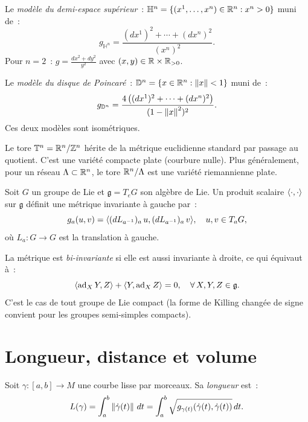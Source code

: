 \begin{exemple}
\label{ex:hyperbolique}
Le \emph{mod\`ele du demi-espace sup\'erieur}~: $\mathbb{H}^n = \{(x^1, \ldots, x^n)
\in \mathbb{R}^n : x^n > 0\}$ muni de~:
\[
    g_{\mathbb{H}^n} = \frac{(dx^1)^2 + \cdots + (dx^n)^2}{(x^n)^2}.
\]
Pour $n = 2$~: $g = \frac{dx^2 + dy^2}{y^2}$ avec $(x, y) \in \mathbb{R} \times \mathbb{R}_{>0}$.

Le \emph{mod\`ele du disque de Poincar\'e}~: $\mathbb{D}^n = \{x \in \mathbb{R}^n : \left\| x \right\| < 1\}$
muni de~:
\[
    g_{\mathbb{D}^n} = \frac{4\left((dx^1)^2 + \cdots + (dx^n)^2\right)}{(1 - \left\| x \right\|^2)^2}.
\]
Ces deux mod\`eles sont isom\'etriques.
\end{exemple}

\begin{exemple}
\label{ex:tore}
Le tore $\mathbb{T}^n = \mathbb{R}^n / \mathbb{Z}^n$ h\'erite de la m\'etrique euclidienne standard
par passage au quotient. C'est une vari\'et\'e compacte plate (courbure nulle).
Plus g\'en\'eralement, pour un r\'eseau $\Lambda \subset \mathbb{R}^n$, le tore $\mathbb{R}^n/\Lambda$
est une vari\'et\'e riemannienne plate.
\end{exemple}

\begin{exemple}
\label{ex:lie}
Soit $G$ un groupe de Lie et $\mathfrak{g} = T_eG$ son alg\`ebre de Lie. Un
produit scalaire $\langle \cdot, \cdot \rangle$ sur $\mathfrak{g}$ d\'efinit une m\'etrique
invariante \`a gauche par~:
\[
    g_a(u, v) = \langle (dL_{a^{-1}})_a\, u, (dL_{a^{-1}})_a\, v \rangle,
    \quad u, v \in T_aG,
\]
o\`u $L_a : G \to G$ est la translation \`a gauche.

La m\'etrique est \emph{bi-invariante} si elle est aussi invariante \`a droite, ce
qui \'equivaut \`a~:
\[
    \langle \operatorname{ad}_X Y, Z \rangle + \langle Y, \operatorname{ad}_X Z \rangle = 0,
    \quad \forall\, X, Y, Z \in \mathfrak{g}.
\]
C'est le cas de tout groupe de Lie compact (la forme de Killing chang\'ee de signe
convient pour les groupes semi-simples compacts).
\end{exemple}

\section{Longueur, distance et volume}

\begin{definition}
Soit $\gamma : [a,b] \to M$ une courbe lisse par morceaux. Sa \emph{longueur} est~:
\[
    L(\gamma) = \int_a^b \left\| \dot{\gamma}(t) \right\| \, dt
    = \int_a^b \sqrt{g_{\gamma(t)}(\dot{\gamma}(t), \dot{\gamma}(t))} \, dt.
\]
\end{definition}

